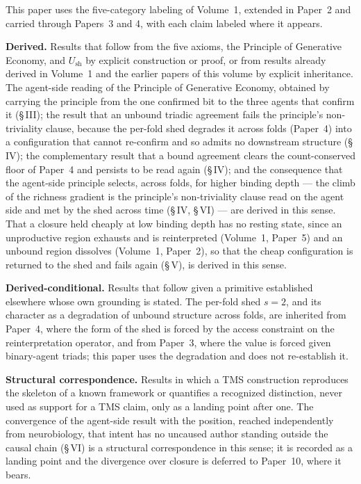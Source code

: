 \documentclass[11pt,oneside]{report}
\theoremstyle{definition}
\theoremstyle{remark}
\begin{document}
This paper uses the five-category labeling of Volume~1, extended in Paper~2 and
carried through Papers~3 and 4, with each claim labeled where it appears.

\textbf{Derived.} Results that follow from the five axioms, the Principle of
Generative Economy, and \ensuremath{U_{\mathrm{sh}}} by explicit construction or
proof, or from results already derived in Volume~1 and the earlier papers of this
volume by explicit inheritance. The agent-side reading of the Principle of
Generative Economy, obtained by carrying the principle from the one confirmed bit
to the three agents that confirm it (\S\,III); the result that an unbound triadic
agreement fails the principle's non-triviality clause, because the per-fold shed
degrades it across folds (Paper~4) into a configuration that cannot re-confirm and so
admits no downstream structure (\S\,IV); the complementary result that a bound agreement
clears the count-conserved floor of Paper~4 and persists to be read again (\S\,IV);
and the consequence that the agent-side principle selects, across folds, for higher
binding depth --- the climb of the richness gradient is the principle's
non-triviality clause read on the agent side and met by the shed across time
(\S\,IV, \S\,VI) --- are derived in this sense. That a closure held cheaply at low
binding depth has no resting state, since an unproductive region exhausts and is
reinterpreted (Volume~1, Paper~5) and an unbound region dissolves
(Volume~1, Paper~2), so that the cheap configuration is returned to the shed and
fails again (\S\,V), is derived in this sense.

\textbf{Derived-conditional.} Results that follow given a primitive established
elsewhere whose own grounding is stated. The per-fold shed \ensuremath{s = 2}, and
its character as a degradation of unbound structure across folds, are inherited from
Paper~4, where the form of the shed is forced by the access constraint on the
reinterpretation operator, and from Paper~3, where the value is forced given
binary-agent triads; this paper uses the degradation and does not re-establish it.

\textbf{Structural correspondence.} Results in which a TMS construction reproduces
the skeleton of a known framework or quantifies a recognized distinction, never used
as support for a TMS claim, only as a landing point after one. The convergence of
the agent-side result with the position, reached independently from neurobiology,
that intent has no uncaused author standing outside the causal chain (\S\,VI) is a
structural correspondence in this sense; it is recorded as a landing point and the
divergence over closure is deferred to Paper~10, where it bears.
\end{document}
